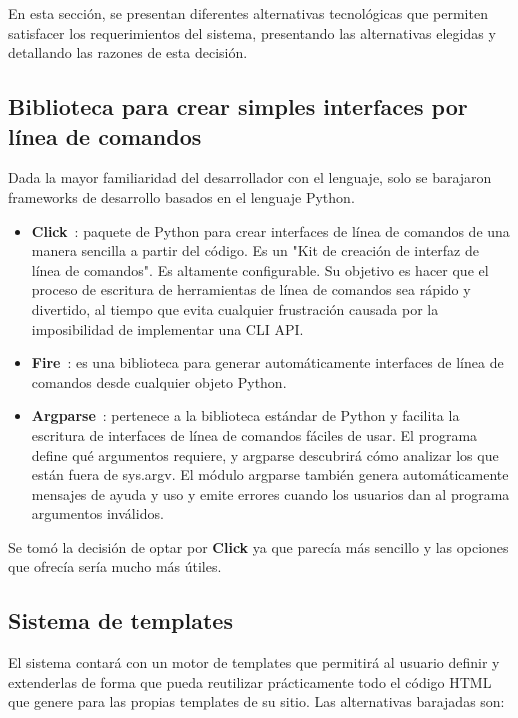 En esta sección, se presentan diferentes alternativas tecnológicas que permiten
satisfacer los requerimientos del sistema, presentando las alternativas elegidas y
detallando las razones de esta decisión.

\subsection{Biblioteca para crear simples interfaces por línea de comandos}

Dada la mayor familiaridad del desarrollador con el lenguaje, solo se barajaron
frameworks de desarrollo basados en el lenguaje Python.

\begin{itemize}
    \item \textbf{Click}~\cite{click}: paquete de Python para crear interfaces de línea de comandos de
una manera sencilla a partir del código. Es un "Kit de creación de interfaz de
línea de comandos". Es altamente configurable. Su objetivo es
hacer que el proceso de escritura de herramientas de línea de comandos sea rápido y divertido, al tiempo
que evita cualquier frustración causada por la imposibilidad de implementar una CLI API.
\item \textbf{Fire}~\cite{python-fire}: es una biblioteca para generar automáticamente interfaces de línea de comandos
desde cualquier objeto Python.
\item \textbf{Argparse}~\cite{argparse}: pertenece a la biblioteca estándar de Python y facilita la escritura de interfaces
de línea de comandos fáciles de usar. El programa define qué argumentos requiere, y argparse descubrirá cómo
analizar los que están fuera de sys.argv. El módulo argparse también genera automáticamente mensajes de ayuda
y uso y emite errores cuando los usuarios dan al programa argumentos inválidos.
\end{itemize}

Se tomó la decisión de optar por \textbf{Click} ya que parecía más sencillo y las opciones que ofrecía sería mucho
más útiles.

\subsection{Sistema de templates}

El sistema contará con un motor de templates que permitirá al usuario definir y extenderlas de forma que pueda reutilizar
prácticamente todo el código HTML que genere para las propias templates de su sitio. Las alternativas barajadas son:


